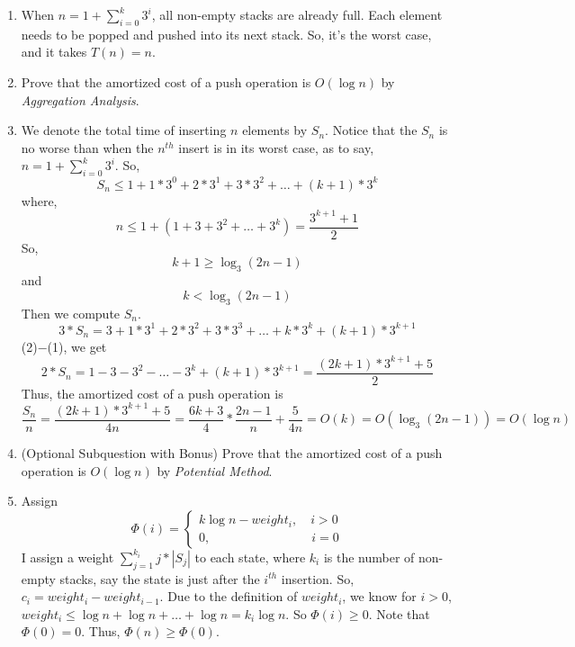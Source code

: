 \documentclass[12pt,a4paper]{article}
\makeatletter
\newtheorem*{solution}{Solution}
\theoremstyle{definition}
\renewenvironment{solution}[1][Solution] {\par\pushQED{\qed}\normalfont\topsep6\p@\@plus6\p@\relax\trivlist\item[\hskip\labelsep\bfseries#1\@addpunct{.}]\ignorespaces}{\popQED\endtrivlist\@endpefalse} \makeatother
\makeatother
\begin{document}
\begin{enumerate}
\begin{enumerate}
        \begin{solution}
        	When $n=1+\sum_{i=0}^{k}3^i$, all non-empty stacks are already full. Each element needs to be popped and pushed into its next stack. So, it's the worst case, and it takes $T(n)=n$.
        	
        \end{solution}
    
        \item Prove that the amortized cost of a push operation is $O(\log n)$ by \emph{Aggregation Analysis}.
        
        \begin{solution}
        	We denote the total time of inserting $n$ elements by $S_n$. Notice that the $S_n$ is no worse than when the $n^{th}$ insert is in its worst case, as to say, $n=1+\sum_{i=0}^{k}3^i$. So,
        	\begin{equation}
        		S_n\leq 1+1*3^0+2*3^1+3*3^2+\dots+(k+1)*3^k
        	\end{equation}
        	where, 
        	$$
        	n\leq 1+(1+3+3^2+\dots+3^k)=\frac{3^{k+1}+1}{2}
        	$$        	
        	So, 
        	$$
        	k+1\geq \log_3(2n-1)$$ and $$k<\log_3(2n-1)
        	$$
        	Then we compute $S_n$.
        	\begin{equation}
        		3*S_n=3+1*3^1+2*3^2+3*3^3+\dots+k*3^k+(k+1)*3^{k+1}
        	\end{equation}
        	(2)$-$(1), we get 
        	$$
        	2*S_n=1-3-3^2-\dots-3^k+(k+1)*3^{k+1}=\frac{(2k+1)*3^{k+1}+5}{2}
        	$$
        	Thus, the amortized cost of a push operation is
        	$$\frac{S_n}{n}=\frac{(2k+1)*3^{k+1}+5}{4n}=\frac{6k+3}{4}*\frac{2n-1}{n}+\frac{5}{4n}=O(k)=O(\log_3(2n-1))=O(\log n)$$
        	
        \end{solution}
    
        \item {\color{red}(Optional Subquestion with Bonus)} Prove that the amortized cost of a push operation is $O(\log n)$ by \emph{Potential Method}.
        
        \begin{solution}
        	Assign
        	$$
        	\Phi(i)=\begin{cases}
        	k\log n- weight_i\nonumber,\quad i>0\\
        	0,\quad\quad\quad\quad\quad\quad\quad\quad i=0
        	\end{cases}
        	$$
        	I assign a weight $\sum_{j=1}^{k_i}j*|S_j|$ to each state, where $k_i$ is the number of non-empty stacks, say the state is just after the $i^{th}$ insertion. So, $c_i=weight_i-weight_{i-1}$. Due to the definition of $weight_i$, we know for $i>0$, $weight_i\leq \log n+\log n+\dots+\log n = k_i\log n$. So $\Phi(i)\geq 0$. Note that $\Phi(0)=0$. Thus, $\Phi(n)\geq\Phi(0)$.
        	

\end{solution}
\end{enumerate}
\end{enumerate}
\end{document}

